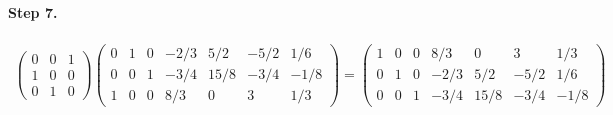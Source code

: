 \documentclass[11pt]{article}
\begin{document}
\paragraph{Step 7.}
\begin{eqnarray*}
\begin{pmatrix}
	0 & 0 & 1 \\
	1 & 0 & 0 \\
	0 & 1 & 0
\end{pmatrix}
\left(\begin{array}{cccccc|c}  
	0 & 1 & 0 & -2/3 & 5/2 & -5/2 & 1/6\\
    0 & 0 & 1 & -3/4 & 15/8 & -3/4 & -1/8\\
    1 & 0 & 0 & 8/3 & 0 & 3 & 1/3
\end{array}\right)
=
\left(\begin{array}{cccccc|c} 
 	1 & 0 & 0 & 8/3 & 0 & 3 & 1/3\\
	0 & 1 & 0 & -2/3 & 5/2 & -5/2 & 1/6\\
    0 & 0 & 1 & -3/4 & 15/8 & -3/4 & -1/8
\end{array}\right)
\end{eqnarray*}
\end{document}
